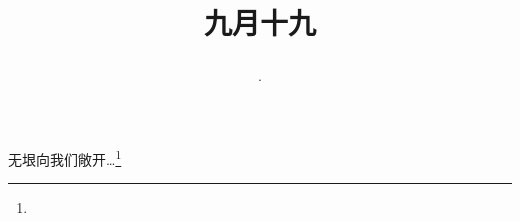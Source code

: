 \title{\date[d=21,m=10,y=2024][year:cn-y,年,month:cn,day:cn,日,·,weekday]·九月十九 }
无垠向我们敞开…\footnote{ }

